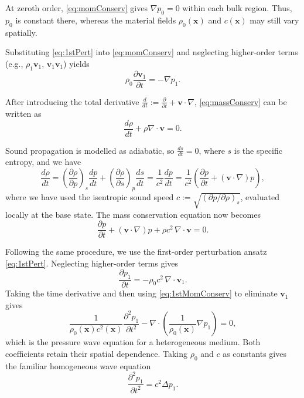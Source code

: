 \documentclass[final,12pt,nopreprintline,longtitle]{elsarticle}
\renewcommand{\v}{\mathbf{v}}
\newcommand{\x}{\mathbf{x}}
\begin{document}
At zeroth order, \cref{eq:momConserv} gives $\nabla p_0=0$ within each
bulk region.  Thus, $p_0$ is constant there, whereas the material fields
$\rho_0(\x)$ and $c(\x)$ may still vary spatially.

Substituting \cref{eq:1stPert} into \cref{eq:momConserv} and neglecting higher-order terms (e.g., $\rho_1\v_1$, $\v_1\v_1$) yields
        \begin{equation}
            \rho_0 \frac{\partial \v_1}{\partial t}=-\nabla p_1.
            \label{eq:1stMomConserv}
        \end{equation}

After introducing the total derivative $\frac{d}{dt}:=\frac{\partial}{\partial t} + \v \cdot \nabla$, \cref{eq:massConserv} can be written as
\begin{equation}
    \frac{d \rho}{dt} + \rho \nabla\cdot\v =0.
\end{equation}

Sound propagation is modelled as adiabatic, so $\frac{d s}{d t}=0$, where $s$
is the specific entropy, and we have \cite{LandauLifshitz1987}
\begin{equation}
     \frac{d \rho}{dt}
     =\left(\frac{\partial \rho}{\partial p}\right)_s\frac{d p}{d t}
     +\left(\frac{\partial \rho}{\partial s}\right)_p\frac{d s}{d t}
     =\frac{1}{c^2}\frac{d p}{d t}
     =\frac{1}{c^2}\left(\frac{\partial p}{\partial t}+(\v\cdot\nabla)p\right),
\end{equation}
where we have used the isentropic sound speed
$c:=\sqrt{(\partial p/\partial \rho)_s}$, evaluated locally at the base state.
The mass conservation equation
now becomes
\begin{equation}
    \frac{\partial p}{\partial t} + (\v\cdot\nabla)p + \rho c^2 \, \nabla\cdot\v = 0.
    \label{eq:pMassConti}
\end{equation}

Following the same procedure, we use the first-order perturbation ansatz \cref{eq:1stPert}. Neglecting higher-order terms gives
\begin{equation}
    \frac{\partial p_1}{\partial t} = -\rho_0 c^2\, \nabla \cdot \v_1.
    \label{eq:1stMassConserv}
\end{equation}
Taking the time derivative and then using \cref{eq:1stMomConserv} to eliminate $\v_1$ gives
\begin{equation}
    \frac{1}{\rho_0(\x)c^2(\x)}
    \frac{\partial^2p_1}{\partial t^2}
    -\nabla\cdot\left(\frac{1}{\rho_0(\x)}\nabla p_1\right)=0,
    \label{eq:heteWaveP}
\end{equation}
which is the pressure wave equation for a heterogeneous medium.  Both
coefficients retain their spatial dependence.  Taking $\rho_0$ and $c$ as
constants gives the familiar homogeneous wave equation
\begin{equation}
    \frac{\partial^2 p_1}{\partial t^2} = c^2 \Delta p_1.
\end{equation}
\end{document}
